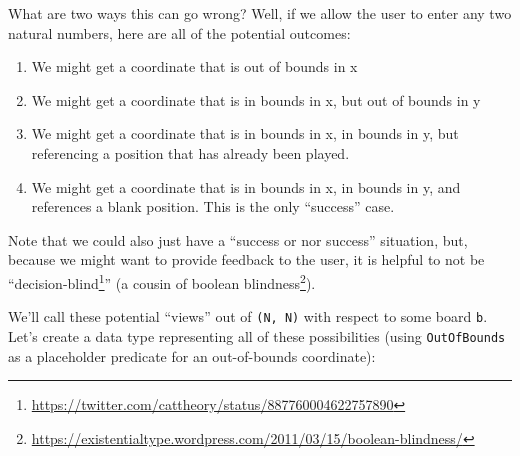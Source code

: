 \documentclass[]{article}
\renewcommand{\href}[2]{#2\footnote{\url{#1}}}
\begin{document}
What are two ways this can go wrong? Well, if we allow the user to enter any two
natural numbers, here are all of the potential outcomes:

\begin{enumerate}
\def\labelenumi{\arabic{enumi}.}
\tightlist
\item
  We might get a coordinate that is out of bounds in x
\item
  We might get a coordinate that is in bounds in x, but out of bounds in y
\item
  We might get a coordinate that is in bounds in x, in bounds in y, but
  referencing a position that has already been played.
\item
  We might get a coordinate that is in bounds in x, in bounds in y, and
  references a blank position. This is the only ``success'' case.
\end{enumerate}

Note that we could also just have a ``success or nor success'' situation, but,
because we might want to provide feedback to the user, it is helpful to not be
``\href{https://twitter.com/cattheory/status/887760004622757890}{decision-blind}''
(a cousin of
\href{https://existentialtype.wordpress.com/2011/03/15/boolean-blindness/}{boolean
blindness}).

We'll call these potential ``views'' out of \texttt{(N,\ N)} with respect to
some board \texttt{b}. Let's create a data type representing all of these
possibilities (using \texttt{OutOfBounds} as a placeholder predicate for an
out-of-bounds coordinate):
\end{document}
